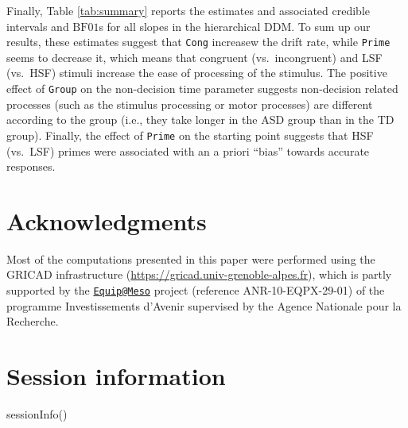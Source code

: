 \documentclass[
  11pt,
  english,
  ,doc,floatsintext]{apa6}
\newenvironment{Shaded}{}{}
\newcommand{\FunctionTok}[1]{\textcolor[rgb]{0.02,0.16,0.49}{#1}}
\newcommand{\NormalTok}[1]{#1}
\begin{document}
Finally, Table \ref{tab:summary} reports the estimates and associated credible intervals and \(\text{BF01}\)s for all slopes in the hierarchical DDM. To sum up our results, these estimates suggest that \texttt{Cong} increasew the drift rate, while \texttt{Prime} seems to decrease it, which means that congruent (vs.~incongruent) and LSF (vs.~HSF) stimuli increase the ease of processing of the stimulus. The positive effect of \texttt{Group} on the non-decision time parameter suggests non-decision related processes (such as the stimulus processing or motor processes) are different according to the group (i.e., they take longer in the ASD group than in the TD group). Finally, the effect of \texttt{Prime} on the starting point suggests that HSF (vs.~LSF) primes were associated with an a priori ``bias'' towards accurate responses.

\hypertarget{acknowledgments}{%
\section{Acknowledgments}\label{acknowledgments}}

Most of the computations presented in this paper were performed using the GRICAD infrastructure (\url{https://gricad.univ-grenoble-alpes.fr}), which is partly supported by the \href{mailto:Equip@Meso}{\nolinkurl{Equip@Meso}} project (reference ANR-10-EQPX-29-01) of the programme Investissements d'Avenir supervised by the Agence Nationale pour la Recherche.

\newpage

\hypertarget{session-information}{%
\section{Session information}\label{session-information}}

\begin{Shaded}
\begin{Highlighting}[]
\FunctionTok{sessionInfo}\NormalTok{()}
\end{Highlighting}
\end{Shaded}
\end{document}
